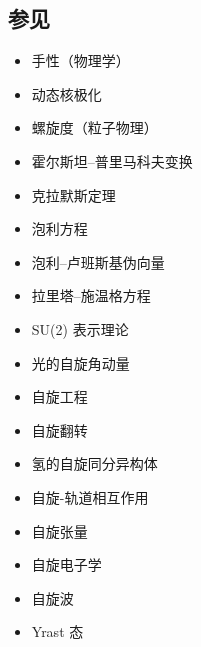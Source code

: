 \subsection{参见}  
\begin{itemize}
\item 手性（物理学）  
\item 动态核极化 
\item 螺旋度（粒子物理）  
\item 霍尔斯坦–普里马科夫变换 
\item 克拉默斯定理  
\item 泡利方程
\item 泡利–卢班斯基伪向量  
\item 拉里塔–施温格方程  
\item SU(2) 表示理论 
\item 光的自旋角动量  
\item 自旋工程 
\item 自旋翻转
\item 氢的自旋同分异构体
\item 自旋-轨道相互作用
\item 自旋张量  
\item 自旋电子学 
\item 自旋波
\item Yrast 态
\end{itemize}
